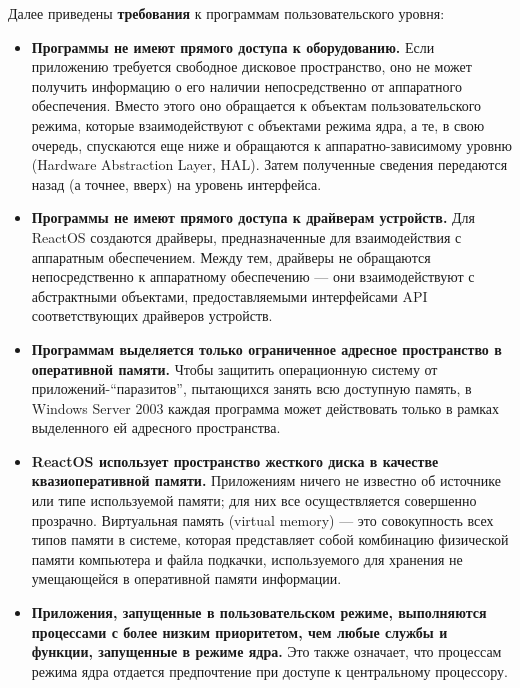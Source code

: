Далее приведены \textbf{требования} к программам пользовательского уровня:
\begin{itemize}
\item \textbf{Программы не имеют прямого доступа к оборудованию.} Если приложению требуется свободное дисковое пространство, оно не может получить информацию о его наличии непосредственно от аппаратного обеспечения. Вместо этого оно обращается к объектам пользовательского режима, которые взаимодействуют с объектами режима ядра, а те, в свою очередь, спускаются еще ниже и обращаются к аппаратно-зависимому уровню (Hardware Abstraction Layer, HAL). Затем полученные сведения передаются назад (а точнее, вверх) на уровень интерфейса.
\item \textbf{Программы не имеют прямого доступа к драйверам устройств.}  Для ReactOS создаются драйверы, предназначенные для взаимодействия с аппаратным обеспечением. Между тем, драйверы не обращаются непосредственно к аппаратному обеспечению — они взаимодействуют с абстрактными объектами, предоставляемыми интерфейсами API соответствующих драйверов устройств.
\item \textbf{Программам выделяется только ограниченное адресное пространство в оперативной памяти.} Чтобы защитить операционную систему от приложений-“паразитов”, пытающихся занять всю доступную память, в Windows Server 2003 каждая программа может действовать только в рамках выделенного ей адресного пространства.
\item \textbf{ReactOS использует пространство жесткого диска в качестве квазиоперативной памяти.} Приложениям ничего не известно об источнике или типе используемой памяти; для них все осуществляется совершенно прозрачно. Виртуальная память (virtual memory) — это совокупность всех типов памяти в системе, которая представляет собой комбинацию физической памяти компьютера и файла подкачки, используемого для хранения не умещающейся в оперативной памяти информации.
\item \textbf{Приложения, запущенные в пользовательском режиме, выполняются процессами с более низким приоритетом, чем любые службы и функции, запущенные в режиме ядра.} Это также означает, что процессам режима ядра отдается предпочтение при доступе к центральному процессору.
\end{itemize}
